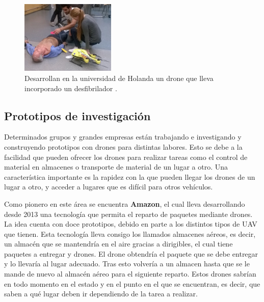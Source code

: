 \begin{figure}[H]
	\centering
		\includegraphics[width=0.4\textwidth]{imgs/drone_desfibrilador.jpg}
		\caption{Desarrollan en la universidad de Holanda un drone que lleva incorporado un desfibrilador .}
	\label{fig: Drone con desfibrilador para emergencias.}
\end{figure} 



\subsection{Prototipos de investigaci\'on }
\hspace{1 cm} Determinados grupos y grandes empresas est\'an trabajando e investigando y construyendo prototipos con drones para distintas labores. Esto se debe a la facilidad que pueden ofrecer los drones para realizar tareas como el control de material en almacenes o transporte de material de un lugar a otro. Una caracter\'istica importante es la rapidez con la que pueden llegar los drones de un lugar a otro, y acceder a lugares que es dif\'icil para otros veh\'iculos. 

\hspace{1 cm} Como pionero en este \'area se encuentra \textbf{Amazon}, el cual lleva desarrollando desde 2013 una tecnolog\'ia que permita el reparto de paquetes mediante drones. La idea cuenta con doce prototipos, debido en parte a los distintos tipos de UAV que tienen.  Esta tecnolog\'ia lleva consigo los llamados almacenes a\'ereos, es decir, un almac\'en que se mantendr\'ia en el aire gracias a dirigibles, el cual tiene paquetes a entregar y drones. El drone obtendr\'ia el paquete que se debe entregar y lo llevar\'ia al lugar adecuado. Tras esto volver\'ia a un almacen hasta que se le mande de nuevo al almac\'en a\'ereo para el siguiente reparto. Estos drones sabr\'ian en todo momento en el estado y en el punto en el que se encuentran, es decir, que saben a qu\'e lugar deben ir dependiendo de la tarea a realizar. 


